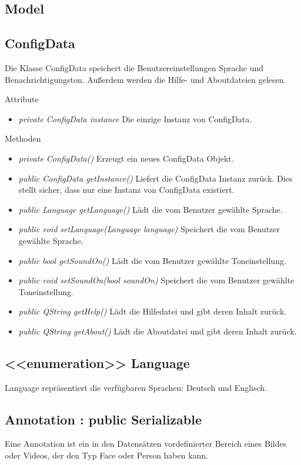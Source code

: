 \subsection{Model}

\subsection*{ConfigData}
Die Klasse ConfigData speichert die Benutzereinstellungen Sprache und Benachrichtigungston. Außerdem werden die Hilfe- und Aboutdateien gelesen.

Attribute
\begin{itemize}
\item\textit{private ConfigData instance} Die einzige Instanz von ConfigData. 
\end{itemize}

Methoden
\begin{itemize}
\item \textit{private ConfigData()} Erzeugt ein neues ConfigData Objekt.
\item \textit{public ConfigData getInstance()} Liefert die ConfigData Instanz zurück. Dies stellt sicher, dass nur eine Instanz von ConfigData existiert.
\item \textit{public Language getLanguage()} Lädt die vom Benutzer gewählte Sprache.
\item \textit{public void setLanguage(Language language)} Speichert die vom Benutzer gewählte Sprache.
\item \textit{public bool getSoundOn()} Lädt die vom Benutzer gewählte Toneinstellung.
\item \textit{public void setSoundOn(bool soundOn)} Speichert die vom Benutzer gewählte Toneinstellung.
\item \textit{public QString getHelp()} Lädt die Hilfedatei und gibt deren Inhalt zurück.
\item \textit{public QString getAbout()} Lädt die Aboutdatei und gibt deren Inhalt zurück.
\end{itemize}

\subsection*{<<enumeration>> Language}
Language repräsentiert die verfügbaren Sprachen: Deutsch und Englisch.

\subsection*{Annotation : public Serializable}
Eine Annotation ist ein in den Datensätzen vordefinierter Bereich eines Bildes oder Videos, der den Typ Face oder Person haben kann.

